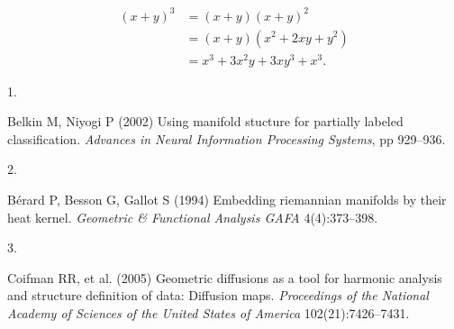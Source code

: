 \documentclass[9pt,twocolumn,twoside,]{pnas-new}
\newlength{\cslhangindent}
\newlength{\csllabelwidth}
\newlength{\cslentryspacingunit} %
\newenvironment{CSLReferences}[2] %
 {%
  \setlength{\parindent}{0pt}
  \ifodd #1
  \let\oldpar\par
  \def\par{\hangindent=\cslhangindent\oldpar}
  \fi
  \setlength{\parskip}{#2\cslentryspacingunit}
 }%
 {}
\newcommand{\CSLLeftMargin}[1]{\parbox[t]{\csllabelwidth}{#1}}
\newcommand{\CSLRightInline}[1]{\parbox[t]{\linewidth - \csllabelwidth}{#1}\break}
\begin{document}
\[\begin{aligned}
(x+y)^3&=(x+y)(x+y)^2\\
       &=(x+y)(x^2+2xy+y^2) \label{eqn:example} \\
       &=x^3+3x^2y+3xy^3+x^3. 
\end{aligned}\]

\showmatmethods
\pnasbreak

\hypertarget{refs}{}
\begin{CSLReferences}{0}{0}
\leavevmode{}%
\CSLLeftMargin{1. }%
\CSLRightInline{Belkin M, Niyogi P (2002) Using manifold stucture for
partially labeled classification. \emph{Advances in Neural Information
Processing Systems}, pp 929--936.}

\leavevmode{}%
\CSLLeftMargin{2. }%
\CSLRightInline{Bérard P, Besson G, Gallot S (1994) Embedding riemannian
manifolds by their heat kernel. \emph{Geometric \& Functional Analysis
GAFA} 4(4):373--398.}

\leavevmode{}%
\CSLLeftMargin{3. }%
\CSLRightInline{Coifman RR, et al. (2005) Geometric diffusions as a tool
for harmonic analysis and structure definition of data: Diffusion maps.
\emph{Proceedings of the National Academy of Sciences of the United
States of America} 102(21):7426--7431.}

\end{CSLReferences}



% 
\end{document}
